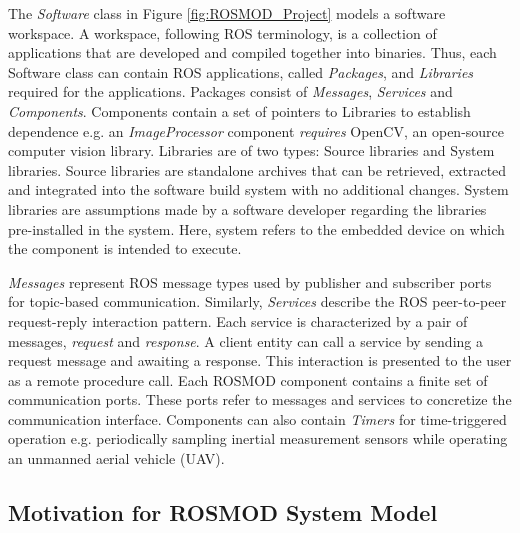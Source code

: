 The \emph{Software} class in Figure \ref{fig:ROSMOD_Project} models a software workspace. A workspace, following ROS terminology, is a collection of applications that are developed and compiled together into binaries. Thus, each Software class can contain ROS applications, called \emph{Packages}, and \emph{Libraries} required for the applications. Packages consist of \emph{Messages}, \emph{Services} and \emph{Components}. Components contain a set of pointers to Libraries to establish dependence e.g. an \emph{ImageProcessor} component \emph{requires} OpenCV, an open-source computer vision library. Libraries are of two types: Source libraries and System libraries. Source libraries are standalone archives that can be retrieved, extracted and integrated into the software build system with no additional changes. System libraries are assumptions made by a software developer regarding the libraries pre-installed in the system. Here, system refers to the embedded device on which the component is intended to execute.

\emph{Messages} represent ROS message types used by publisher and subscriber ports for topic-based communication. Similarly, \emph{Services} describe the ROS peer-to-peer request-reply interaction pattern. Each service is characterized by a pair of messages, \emph{request} and \emph{response}. A client entity can call a service by sending a request message and awaiting a response. This interaction is presented to the user as a remote procedure call. Each ROSMOD component contains a finite set of communication ports. These ports refer to messages and services to concretize the communication interface. Components can also contain \emph{Timers} for time-triggered operation e.g. periodically sampling inertial measurement sensors while operating an unmanned aerial vehicle
(UAV).

\subsection{Motivation for ROSMOD System Model}


